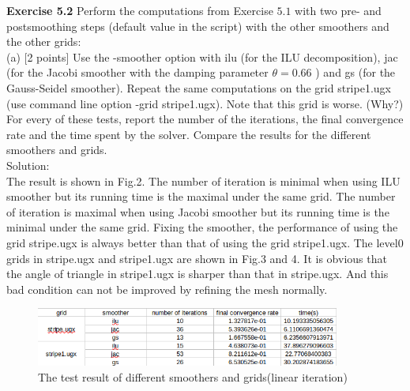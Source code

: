 \documentclass[a4paper]{article}
\begin{document}
\noindent \textbf{Exercise 5.2} Perform the computations from Exercise $5.1$ with two pre- and postsmoothing steps (default value in the script) with the other smoothers and the other grids:\\

\noindent (a) [2 points] Use the -smoother option with ilu (for the ILU decomposition), jac (for the Jacobi smoother with the damping parameter $\theta=0.66$ ) and gs (for the Gauss-Seidel smoother). Repeat the same computations on the grid stripe1.ugx (use command line option -grid stripe1.ugx). Note that this grid is worse. (Why?) For every of these tests, report the number of the iterations, the final convergence rate and the time spent by the solver. Compare the results for the different smoothers and grids.\\

\noindent Solution:\\

\noindent The result is shown in Fig.2. The number of iteration is minimal when using ILU smoother but its running time is the maximal under the same grid. The number of iteration is maximal when using Jacobi smoother but its running time is the minimal under the same grid. Fixing the smoother, the performance of using the grid stripe.ugx is always better  than that of using the grid stripe1.ugx. The level0 grids in stripe.ugx and stripe1.ugx are shown in Fig.3 and 4. It is obvious that the angle of triangle in stripe1.ugx is sharper than that in stripe.ugx. And this bad condition can not be improved by refining the mesh normally.\\

\begin{figure}[htbp]
	\centering
	\begin{minipage}[t]{0.7\textwidth}
		\centering		\includegraphics[width=10cm]{5.2a.png}
		\caption{The test result of different smoothers and grids(linear iteration)}
	\end{minipage}
\end{figure}
\end{document}
